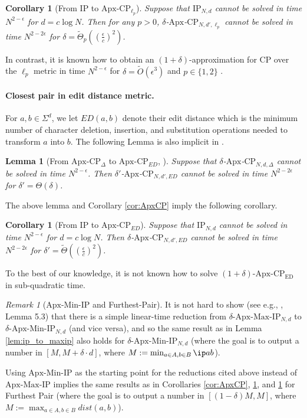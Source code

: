 \documentclass[11pt]{article}
\theoremstyle{plain}
\newtheorem{lem}[thm]{Lemma}
\newtheorem{cor}[thm]{Corollary}
\theoremstyle{remark}
\newtheorem{rem}{Remark}
\newcommand{\IP}{\mathrm{IP}}
\newcommand{\Max}{\mathrm{Max}}
\newcommand{\Min}{\mathrm{Min}}
\newcommand{\CP}{\mathrm{CP}}
\newcommand{\ED}{\mathrm{ED}}
\newcommand{\Apx}{\mathrm{Apx}}
\begin{document}
\begin{cor}[From $\IP$ to $\Apx$-$\CP_{\ell_p}$]\label{cor:iptolp}
    Suppose that $\IP_{N,d}$ cannot be solved in time $N^{2-\epsilon}$ for $d = c \log N$. Then for any $p>0$, $\delta$-$\Apx$-$\CP_{N,d',\ell_p}$ cannot be solved in time $N^{2-2\epsilon}$ for $\delta = \tilde \Theta_p((\frac{\epsilon}{c})^{2})$.
\end{cor}


In contrast, it is known how to obtain an $(1+\delta)$-approximation for CP over the $\ell_p$ metric in time $N^{2-\epsilon}$ for $\delta=\tilde O (\epsilon^{3})$ and $p \in \{1,2\}$ \cite{ACW16}.

\paragraph{Closest pair in edit distance metric.}

For $a,b\in\Sigma^{d}$, we let $ED(a,b)$ denote their \textsf{edit distance} which is the minimum number of character deletion, insertion, and substitution operations needed to transform $a$ into $b$.   The following Lemma is also implicit in \cite{Rub18}.

\begin{lem}[From $\Apx$-$\CP_{\Delta}$ to $\Apx$-$\CP_{ED}$, \cite{Rub18}]\label{lem:CPtoED}
Suppose that $\delta$-$\Apx$-$\CP_{N, d, \Delta}$ cannot be solved in time $N^{2-\epsilon}$. Then $\delta'$-$\Apx$-$\CP_{N,d',ED}$ cannot be solved in time $N^{2-2\epsilon}$ for  $\delta' = \Theta(\delta)$.
\end{lem}

The above lemma and Corollary \ref{cor:ApxCP} imply the following corollary.

\begin{cor}[From $\IP$ to $\Apx$-$\CP_{ED}$] \label{cor:iptoed}
Suppose that $\IP_{N,d}$ cannot be solved in time $N^{2-\epsilon}$ for $d = c \log N$. Then $\delta$-$\Apx$-$\CP_{N,d',ED}$ cannot be solved in time $N^{2-2\epsilon}$ for $\delta' = \tilde \Theta( ( \frac \epsilon c)^2 ) $.
\end{cor}


To the best of our knowledge, it is not known how to solve $(1+\delta)$-$\Apx$-$\CP_{\ED}$ in sub-quadratic time.

\begin{rem}[$\Apx$-$\Min$-$\IP$ and Furthest-Pair]
	It is not hard to show (see e.g., \cite{CW19}, Lemma 5.3) that there is a simple linear-time reduction from $\delta$-$\Apx$-$\Max$-$\IP_{N,d}$ to $\delta$-$\Apx$-$\Min$-$\IP_{N,d}$ (and vice versa), and so the same result as in Lemma \ref{lem:ip_to_maxip} also holds for $\delta$-$\Apx$-$\Min$-$\IP_{N,d}$  (where the goal is to output a number in $[M,M+\delta \cdot d]$, where $M:=\min_{a \in A,b \in B} \ip a b$).
	
	Using $\Apx$-$\Min$-$\IP$ as the starting point for the reductions cited above instead of $\Apx$-$\Max$-$\IP$ implies the same results as in Corollaries \ref{cor:ApxCP}, \ref{cor:iptolp}, and \ref{cor:iptoed} for Furthest Pair (where the goal is to output a number in $[(1-\delta)M,M]$, where $M:=\max_{a \in A, b \in B}dist(a,b)$).
\end{rem}
\end{document}
